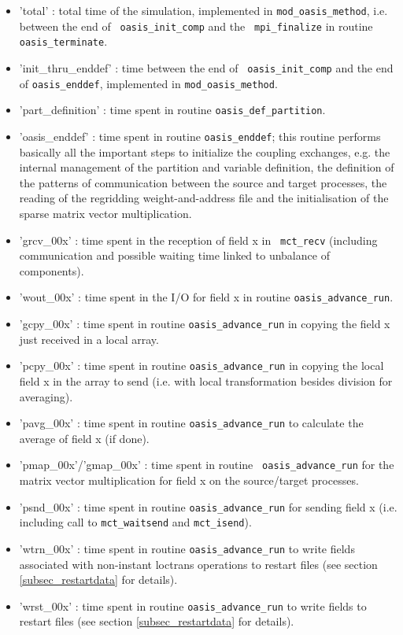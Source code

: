 \begin{itemize}

\item {'total'} : total time of the simulation, implemented
  in {\tt mod\_oasis\_method}, i.e. between the end of {\tt
    oasis\_init\_comp} and the {\tt
    mpi\_finalize} in routine {\tt oasis\_terminate}.

\item {'init\_thru\_enddef'} : time between the end of {\tt
    oasis\_init\_comp} and the end of {\tt oasis\_enddef}, implemented
  in {\tt mod\_oasis\_method}.

\item {'part\_definition'} : time spent in routine {\tt oasis\_def\_partition}.

\item {'oasis\_enddef'} : time spent in 
  routine {\tt oasis\_enddef}; this routine performs basically all the
  important steps to initialize the coupling exchanges, e.g. the
  internal management of the partition and variable definition, the
  definition of the patterns of communication between the source and
  target processes, the reading of the regridding weight-and-address
  file and the initialisation of the sparse matrix vector multiplication.
\item {'grcv\_00x'} : time spent in the reception of field x in {\tt
    mct\_recv} (including communication and possible waiting time
  linked to unbalance of components).
\item {'wout\_00x'} : time spent in the I/O for field x in routine
  {\tt oasis\_advance\_run}.
\item {'gcpy\_00x'} : time spent in routine {\tt oasis\_advance\_run}
  in copying the field x just received in a local array.
\item {'pcpy\_00x'} : time spent in routine {\tt oasis\_advance\_run}
  in copying the local field x in the array to send (i.e. with local
  transformation besides division for averaging).
\item {'pavg\_00x'} : time spent in routine {\tt oasis\_advance\_run}
  to calculate the average of field x (if done).
\item {'pmap\_00x'/'gmap\_00x'} : time spent in routine {\tt
    oasis\_advance\_run} for the matrix vector multiplication for
  field x on the source/target processes.
\item {'psnd\_00x'} : time spent in routine {\tt oasis\_advance\_run}
  for sending field x (i.e. including call to {\tt mct\_waitsend} and
  {\tt mct\_isend}).
\item {'wtrn\_00x'} : time spent in routine {\tt oasis\_advance\_run}
  to write fields associated with non-instant loctrans operations to
  restart files  (see section \ref{subsec_restartdata} for details).
\item {'wrst\_00x'} : time spent in routine {\tt oasis\_advance\_run}
  to write fields to
  restart files (see section \ref{subsec_restartdata} for details).
\end{itemize}

